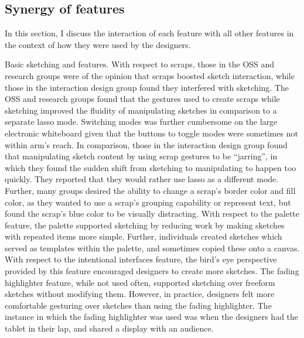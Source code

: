 \subsection{Synergy of features}

In this section, I discuss the interaction of each feature with all other features in the context of how they were used by the designers.

Basic sketching and features. With respect to scraps, those in the OSS and research groups were of the opinion that scraps boosted sketch interaction, while those in the interaction design group found they interfered with sketching. The OSS and research groups found that the gestures used to create scraps while sketching improved the fluidity of manipulating sketches in comparison to a separate lasso mode. Switching modes was further cumbersome on the large electronic whiteboard given that the buttons to toggle modes were sometimes not within arm's reach. In comparison, those in the interaction design group found that manipulating sketch content by using scrap gestures to be ``jarring'', in which they found the sudden shift from sketching to manipulating to happen too quickly. They reported that they would rather use lasso as a different mode. Further, many groups desired the ability to change a scrap's border color and fill color, as they wanted to use a scrap's grouping capability or represent text, but found the scrap's blue color to be visually distracting. With respect to the palette feature, the palette supported sketching by reducing work by making sketches with repeated items more simple. Further, individuals created sketches which served as templates within the palette, and sometimes copied these onto a canvas. With respect to the intentional interfaces feature, the bird's eye perspective provided by this feature encouraged designers to create more sketches. The fading highlighter feature, while not used often, supported sketching over freeform sketches without modifying them. However, in practice, designers felt more comfortable gesturing over sketches than using the fading highlighter. The instance in which the fading highlighter was used was when the designers had the tablet in their lap, and shared a display with an audience.

